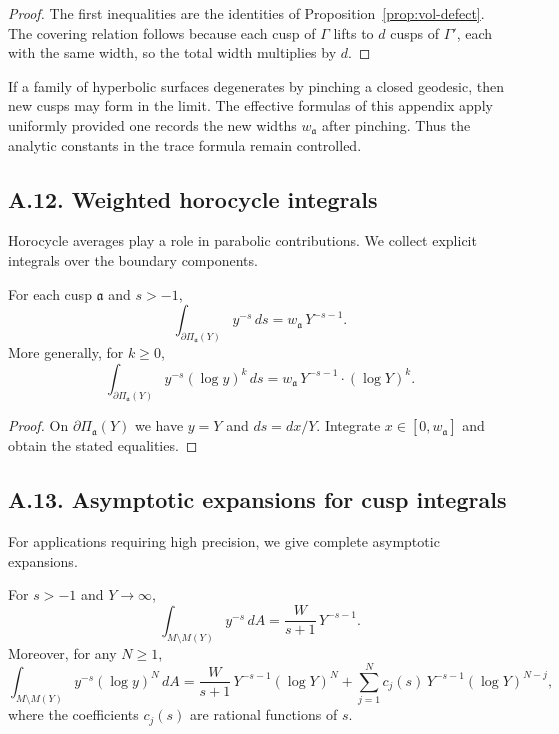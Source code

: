 \begin{proof}
The first inequalities are the identities of Proposition~\ref{prop:vol-defect}.
The covering relation follows because each cusp of $\Gamma$ lifts to $d$ cusps
of $\Gamma'$, each with the same width, so the total width multiplies by $d$.
\end{proof}

\begin{remark}
If a family of hyperbolic surfaces degenerates by pinching a closed geodesic,
then new cusps may form in the limit. The effective formulas of this appendix
apply uniformly provided one records the new widths $w_{\mathfrak a}$ after
pinching. Thus the analytic constants in the trace formula remain controlled.
\end{remark}

\subsection*{A.12. Weighted horocycle integrals}

\noindent
Horocycle averages play a role in parabolic contributions. We collect explicit
integrals over the boundary components.

\begin{lemma}\label{lem:horo-av}
For each cusp $\mathfrak a$ and $s>-1$,
\[
\int_{\partial\Pi_{\mathfrak a}(Y)} y^{-s}\,ds = w_{\mathfrak a}\,Y^{-s-1}.
\]
More generally, for $k\ge 0$,
\[
\int_{\partial\Pi_{\mathfrak a}(Y)} y^{-s}(\log y)^k\,ds
= w_{\mathfrak a}\,Y^{-s-1}\cdot(\log Y)^k.
\]
\end{lemma}

\begin{proof}
On $\partial\Pi_{\mathfrak a}(Y)$ we have $y=Y$ and $ds=dx/Y$. Integrate
$x\in[0,w_{\mathfrak a}]$ and obtain the stated equalities.
\end{proof}

\subsection*{A.13. Asymptotic expansions for cusp integrals}

\noindent
For applications requiring high precision, we give complete asymptotic expansions.

\begin{proposition}\label{prop:asy-tail}
For $s>-1$ and $Y\to\infty$,
\[
\int_{M\setminus M(Y)} y^{-s}\,dA
=\frac{W}{s+1}\,Y^{-s-1}.
\]
Moreover, for any $N\ge 1$,
\[
\int_{M\setminus M(Y)} y^{-s}(\log y)^N\,dA
=\frac{W}{s+1}\,Y^{-s-1}(\log Y)^N
+ \sum_{j=1}^{N} c_j(s)\,Y^{-s-1}(\log Y)^{N-j},
\]
where the coefficients $c_j(s)$ are rational functions of $s$.
\end{proposition}

